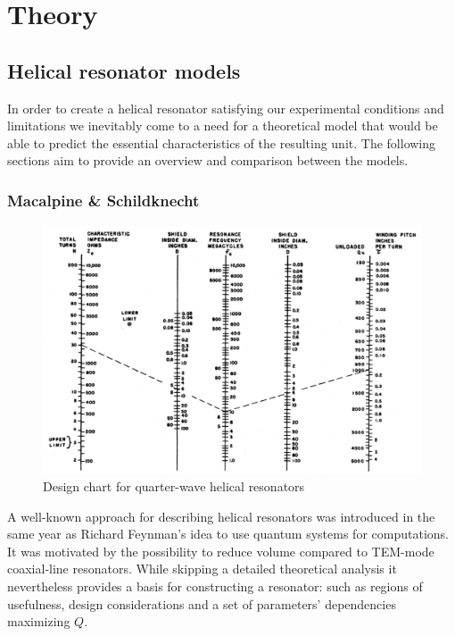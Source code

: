 \chapter{Theory}

\section{Helical resonator models}
In order to create a helical resonator satisfying our experimental conditions and limitations we inevitably come to a need for a theoretical model that would be able to predict the essential characteristics of the resulting unit. The following sections aim to provide an overview and comparison between the models.

\subsection{Macalpine \& Schildknecht}
\begin{figure}[h!]
	\centering
	\includegraphics[width=.99\textwidth]{images/macalpine_chart}
	\caption{Design chart for quarter-wave helical resonators \cite{Macalpine2000}}
	\label{fig:macalpine_chart}
\end{figure}

A well-known approach \cite{Macalpine2000} for describing helical resonators was introduced in the same year as Richard Feynman's idea \cite{Feynman1960} to use quantum systems for computations. It was motivated by the possibility to reduce volume compared to TEM-mode coaxial-line resonators. While skipping a detailed theoretical analysis it nevertheless provides a basis for constructing a resonator: such as regions of usefulness, design considerations and a set of parameters' dependencies maximizing $Q$.

